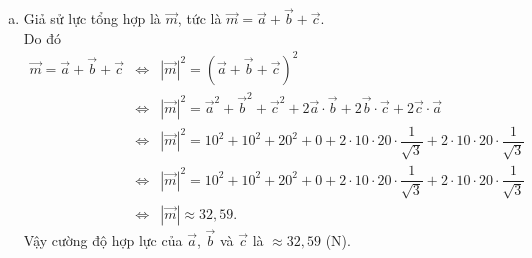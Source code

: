 \begin{ex}
{\begin{enumerate}[a)]
\begin{itemize}
				            Suy ra $\big|\vec{a}+\vec{c}\big|=\sqrt{500+\dfrac{400\sqrt{3}}{3}}$.
				      \item [$\bullet$] $\big(\vec{b}+\vec{c}\big)^2=|\vec{b}|^2+2\vec{b} \cdot \vec{c}+|\vec{c}|^2=10^2+2.10.20.\dfrac{1}{\sqrt{3}}+20^2=500+\dfrac{400\sqrt{3}}{3}$.\\
				            Suy ra $\big|\vec{b}+\vec{c}\big|=\sqrt{500+\dfrac{400\sqrt{3}}{3}}$.
			      \end{itemize}
			      Vậy $\big|\vec{a}+\vec{c}\big|=\big|\vec{b}+\vec{c}\big|$.
			\item Giả sử lực tổng hợp là $\vec{m}$, tức là $\vec{m}=\vec{a}+\vec{b}+\vec{c}$.\\
			      Do đó
			      \allowdisplaybreaks
			      \begin{eqnarray*}
				      \vec{m}=\vec{a}+\vec{b}+\vec{c} &\Leftrightarrow& \left|\vec{m}\right|^2= \left(\vec{a}+\vec{b}+\vec{c}\right)^2\\
				      &\Leftrightarrow& \left|\vec{m}\right|^2= \vec{a}^2+\vec{b}^2+\vec{c}^2+2\vec{a}\cdot\vec{b}+2\vec{b}\cdot\vec{c}+2\vec{c}\cdot\vec{a}\\
				      &\Leftrightarrow& \left|\vec{m}\right|^2= 10^2+10^2+20^2+0+2\cdot 10\cdot 20 \cdot \dfrac{1}{\sqrt3} +2\cdot 10\cdot 20 \cdot \dfrac{1}{\sqrt3}\\
				      &\Leftrightarrow& \left|\vec{m}\right|^2= 10^2+10^2+20^2+0+2\cdot 10\cdot 20 \cdot \dfrac{1}{\sqrt3} +2\cdot 10\cdot 20 \cdot \dfrac{1}{\sqrt3}\\
				      &\Leftrightarrow& \left|\vec{m}\right| \approx 32{,}59.
			      \end{eqnarray*}
			      Vậy cường độ hợp lực của $\vec{a}$, $\vec{b}$ và $\vec{c}$ là $\approx 32{,}59$ (N).
		\end{enumerate}
	}
\end{ex}
